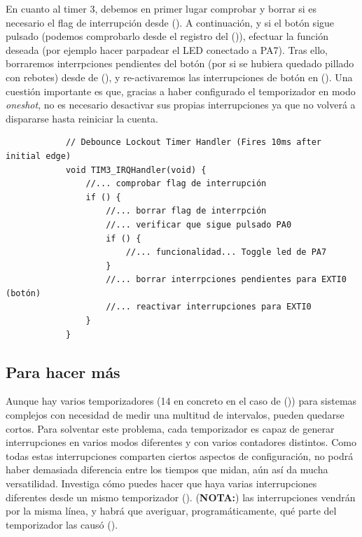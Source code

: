 \documentclass[../main.tex]{subfiles}
\begin{document}
        En cuanto al timer 3, debemos en primer lugar comprobar y borrar si es necesario el flag de interrupción desde  (\REFMAN[19.4.5]). A continuación, y si el botón sigue pulsado (podemos comprobarlo desde el registro  del  (\REFMAN[6.4.5])), efectuar la función deseada (por ejemplo hacer parpadear el LED conectado a PA7). Tras ello, borraremos interrpciones pendientes del botón (por si se hubiera quedado pillado con rebotes) desde  de  (\REFMAN[10.9.6]), y re-activaremos las interrupciones de botón en  (\REFMAN[10.9.1]). Una cuestión importante es que, gracias a haber configurado el temporizador en modo \emph{oneshot}, no es necesario desactivar sus propias interrupciones ya que no volverá a dispararse hasta reiniciar la cuenta.

        \begin{lstlisting}            
            // Debounce Lockout Timer Handler (Fires 10ms after initial edge)
            void TIM3_IRQHandler(void) {
                //... comprobar flag de interrupción
                if () {
                    //... borrar flag de interrpción
                    //... verificar que sigue pulsado PA0
                    if () {
                        //... funcionalidad... Toggle led de PA7
                    }
                    //... borrar interrpciones pendientes para EXTI0 (botón) 
                    //... reactivar interrupciones para EXTI0
                }
            }
        \end{lstlisting}
    
    \subsection{Para hacer más}
        Aunque hay varios temporizadores (14 en concreto en el caso de \MCU (\REFMAN[18,19,20])) para sistemas complejos con necesidad de medir una multitud de intervalos, pueden quedarse cortos. Para solventar este problema, cada temporizador es capaz de generar interrupciones en varios modos diferentes y con varios contadores distintos. Como todas estas interrupciones comparten ciertos aspectos de configuración, no podrá haber demasiada diferencia entre los tiempos que midan, aún así da mucha versatilidad. Investiga cómo puedes hacer que haya varias interrupciones diferentes desde un mismo temporizador (\REFMAN[19]). (\textbf{NOTA:}) las interrupciones vendrán por la misma línea, y habrá que averiguar, programáticamente, qué parte del temporizador las causó (\REFMAN[19.4.4,19.4.5]).
\end{document}
